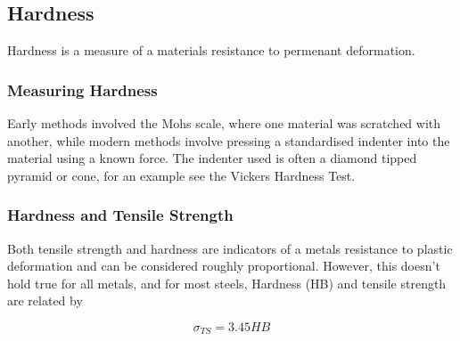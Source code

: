 \documentclass[10pt,a4paper]{article}
\begin{document}
	\subsection{Hardness}
		Hardness is a measure of a materials resistance to permenant deformation. 
		
		\subsubsection{Measuring Hardness}		
		Early methods involved the Mohs scale, where one material was scratched with another, while modern methods involve pressing a standardised indenter into the material using a known force. The indenter used is often a diamond tipped pyramid or cone, for an example see the Vickers Hardness Test.
		
		 \subsubsection{Hardness and Tensile Strength}
		 	Both tensile strength and hardness are indicators of a metals resistance to plastic deformation and can be considered roughly proportional. However, this doesn't hold true for all metals, and for most steels, Hardness (HB) and tensile strength are related by
		 	
		 	\[\sigma_{TS}=3.45HB \]
			
			
\end{document}
